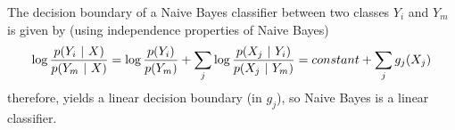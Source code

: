 \tftrue

The decision boundary of a Naive Bayes classifier between two classes $Y_i$ and $Y_m$ is given by (using independence properties of Naive Bayes)
\begin{equation*}
    \log \frac{p(Y_i ~\vert~ X)}{p(Y_m ~\vert~ X)} = \log \frac{p(Y_i)}{p(Y_m)} + \sum_j \log \frac{p(X_j ~\vert~ Y_i)}{p(X_j ~\vert~ Y_m)} = constant + \sum_j g_j(X_j)
\end{equation*}
therefore, yields a linear decision boundary (in $g_j$), so Naive Bayes is a linear classifier.